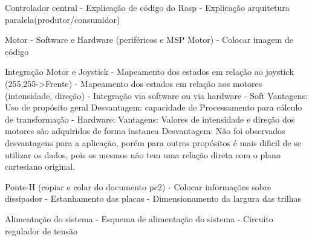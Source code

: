 Controlador central
  - Explicação de código do Rasp
    - Explicação arquitetura paralela(produtor/consumidor)

Motor
  - Software e Hardware (periféricos e MSP Motor)
    - Colocar imagem de código

Integração Motor e Joystick
  - Mapeamento dos estados em relação ao joystick (255,255->Frente)
  - Mapeamento dos estados em relação aos motores (intensidade, direção)
  - Integração via software ou via hardware
    - Soft
      Vantagens: Uso de propósito geral
      Desvantagem: capacidade de Processamento para cálculo de transformação
    - Hardware:
      Vantagens: Valores de intensidade e direção dos motores são adquiridos de forma instanea
      Desvantagem: Não foi observados desvantagens para a aplicação, porém para outros propósitos é mais dificil de se utilizar os dados, pois os mesmos não tem uma relação direta com o plano cartesiano original.

Ponte-H (copiar e colar do documento pc2)
  - Colocar informações sobre dissipador
  - Estanhamento das placas
  - Dimensionamento da largura das trilhas

Alimentação do sistema
  - Esquema de alimentação do sistema
  - Circuito regulador de tensão
